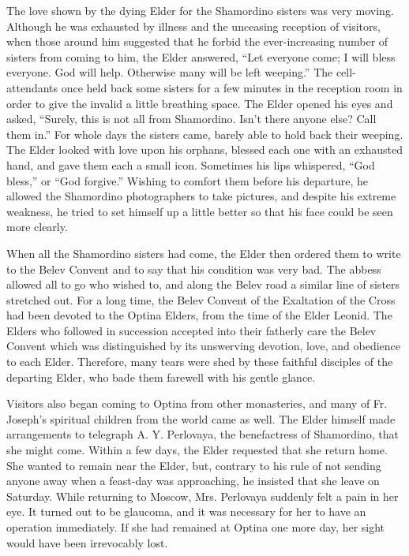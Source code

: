The love shown by the dying Elder for the Shamordino sisters was very moving. Although he was exhausted by illness and the unceasing reception of visitors, when those around him suggested that he forbid the ever-increasing number of sisters from coming to him, the Elder answered, ``Let everyone come; I will bless everyone. God will help. Otherwise many will be left weeping.'' The cell-attendants once held back some sisters for a few minutes in the reception room in order to give the invalid a little breathing space. The Elder opened his eyes and asked, ``Surely, this is not all from Shamordino. Isn't there anyone else? Call them in.'' For whole days the sisters came, barely able to hold back their weeping. The Elder looked with love upon his orphans, blessed each one with an exhausted hand, and gave them each a small icon. Sometimes his lips whispered, ``God bless,'' or ``God forgive.'' Wishing to comfort them before his departure, he allowed the Shamordino photographers to take pictures, and despite his extreme weakness, he tried to set himself up a little better so that his face could be seen more clearly.

When all the Shamordino sisters had come, the Elder then ordered them to write to the Belev Convent and to say that his condition was very bad. The abbess allowed all to go who wished to, and along the Belev road a similar line of sisters stretched out. For a long time, the Belev Convent of the Exaltation of the Cross had been devoted to the Optina Elders, from the time of the Elder Leonid. The Elders who followed in succession accepted into their fatherly care the Belev Convent which was distinguished by its unswerving devotion, love, and obedience to each Elder. Therefore, many tears were shed by these faithful disciples of the departing Elder, who bade them farewell with his gentle glance.

Visitors also began coming to Optina from other monasteries, and many of Fr. Joseph's spiritual children from the world came as well. The Elder himself made arrangements to telegraph A. Y. Perlovaya, the benefactress of Shamordino, that she might come. Within a few days, the Elder requested that she return home. She wanted to remain near the Elder, but, contrary to his rule of not sending anyone away when a feast-day was approaching, he insisted that she leave on Saturday. While returning to Moscow, Mrs. Perlovaya suddenly felt a pain in her eye. It turned out to be glaucoma, and it was necessary for her to have an operation immediately. If she had remained at Optina one more day, her sight would have been irrevocably lost.

